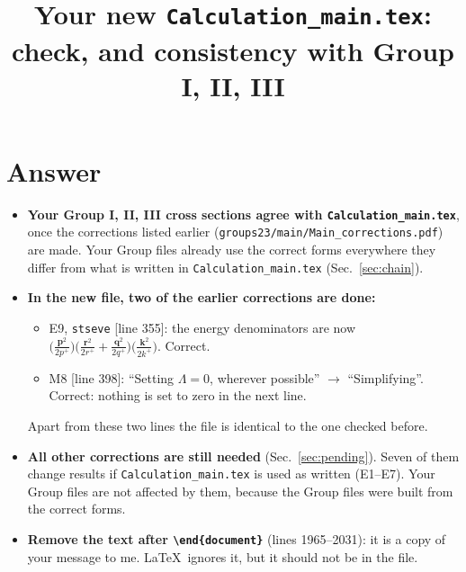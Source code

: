 \documentclass[10pt]{article}
\title{Your new \texttt{Calculation\_main.tex}: check, and consistency with Group I, II, III}
\date{}
\def\v#1{\mathbf{#1}}
\begin{document}
\maketitle

\section{Answer}
\begin{itemize}
\item \textbf{Your Group I, II, III cross sections agree with \texttt{Calculation\_main.tex}}, once the corrections listed earlier (\texttt{groups23/main/Main\_corrections.pdf}) are made. Your Group files already use the correct forms everywhere they differ from what is written in \texttt{Calculation\_main.tex} (Sec.~\ref{sec:chain}).
\item \textbf{In the new file, two of the earlier corrections are done:}
\begin{itemize}
\item E9, \texttt{stseve} [line 355]: the energy denominators are now $\big(\frac{\v p^2}{2p^+}\big)\big(\frac{\v r^2}{2r^+}+\frac{\v q^2}{2q^+}\big)\big(\frac{\v k^2}{2k^+}\big)$. Correct.
\item M8 [line 398]: ``Setting $\Lambda=0$, wherever possible'' $\to$ ``Simplifying''. Correct: nothing is set to zero in the next line.
\end{itemize}
Apart from these two lines the file is identical to the one checked before.
\item \textbf{All other corrections are still needed} (Sec.~\ref{sec:pending}). Seven of them change results if \texttt{Calculation\_main.tex} is used as written (E1--E7). Your Group files are not affected by them, because the Group files were built from the correct forms.
\item \textbf{Remove the text after \texttt{\textbackslash end\{document\}}} (lines 1965--2031): it is a copy of your message to me. \LaTeX\ ignores it, but it should not be in the file.
\end{itemize}
\end{document}
